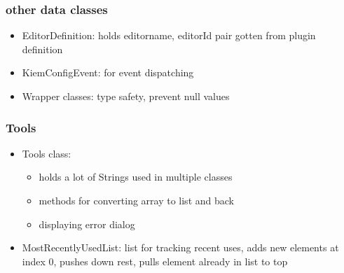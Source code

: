 \subsubsection{other data classes}
\begin{itemize}
 \item EditorDefinition: holds editorname, editorId pair gotten from plugin definition
 \item KiemConfigEvent: for event dispatching
 \item Wrapper classes: type safety, prevent null values
\end{itemize}

\subsubsection{Tools}
\begin{itemize}
 \item Tools class:
  \begin{itemize}
    \item holds a lot of Strings used in multiple classes
    \item methods for converting array to list and back
    \item displaying error dialog
  \end{itemize}
 \item MostRecentlyUsedList: list for tracking recent uses, adds new elements at index 0, pushes down rest, pulls element already in list to top
\end{itemize}
